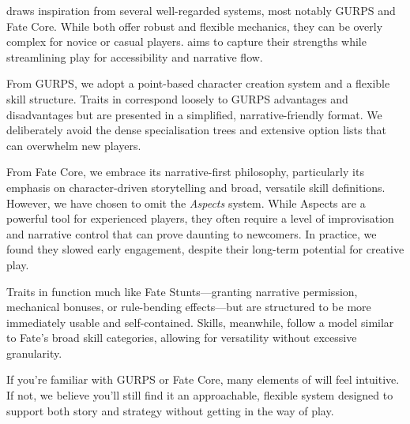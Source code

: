 \wyrd draws inspiration from several well-regarded systems, most notably GURPS and Fate Core. While both offer robust and flexible mechanics, they can be overly complex for novice or casual players. \wyrd aims to capture their strengths while streamlining play for accessibility and narrative flow.

From GURPS, we adopt a point-based character creation system and a flexible skill structure. Traits in \wyrd correspond loosely to GURPS advantages and disadvantages but are presented in a simplified, narrative-friendly format. We deliberately avoid the dense specialisation trees and extensive option lists that can overwhelm new players.

From Fate Core, we embrace its narrative-first philosophy, particularly its emphasis on character-driven storytelling and broad, versatile skill definitions. However, we have chosen to omit the \emph{Aspects} system. While Aspects are a powerful tool for experienced players, they often require a level of improvisation and narrative control that can prove daunting to newcomers. In practice, we found they slowed early engagement, despite their long-term potential for creative play.

Traits in \wyrd function much like Fate Stunts—granting narrative permission, mechanical bonuses, or rule-bending effects—but are structured to be more immediately usable and self-contained. Skills, meanwhile, follow a model similar to Fate’s broad skill categories, allowing for versatility without excessive granularity.

If you're familiar with GURPS or Fate Core, many elements of \wyrd will feel intuitive. If not, we believe you’ll still find it an approachable, flexible system designed to support both story and strategy without getting in the way of play.


